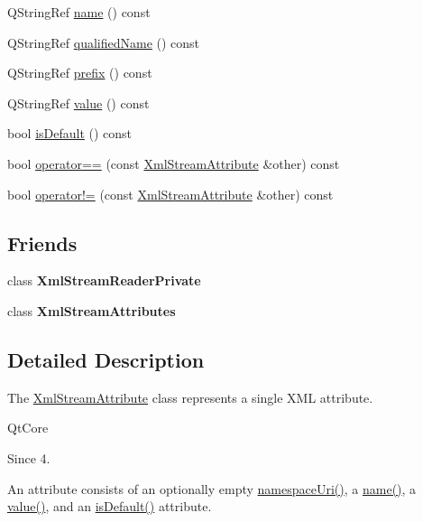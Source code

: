 \begin{DoxyCompactItemize}
Q\+String\+Ref \hyperlink{class_xml_stream_attribute_a2053ea2d13de7262dac760788ed8265f}{name} () const
\item 
Q\+String\+Ref \hyperlink{class_xml_stream_attribute_acc21c4ce8b0539d6c1131ab789171dd9}{qualified\+Name} () const
\item 
Q\+String\+Ref \hyperlink{class_xml_stream_attribute_a09aa6449118ecdcdbba90cc0b05f9e33}{prefix} () const
\item 
Q\+String\+Ref \hyperlink{class_xml_stream_attribute_a0cd7ec6aa7531c411ed20a354c2e7f24}{value} () const
\item 
bool \hyperlink{class_xml_stream_attribute_ab2798a63f4ca2dd71004602f94bddc53}{is\+Default} () const
\item 
bool \hyperlink{class_xml_stream_attribute_aeb585e0fb002453ec3a176accb119c6a}{operator==} (const \hyperlink{class_xml_stream_attribute}{Xml\+Stream\+Attribute} \&other) const
\item 
bool \hyperlink{class_xml_stream_attribute_a2a64fc419c69526cd7260cd49d7ad17f}{operator!=} (const \hyperlink{class_xml_stream_attribute}{Xml\+Stream\+Attribute} \&other) const
\end{DoxyCompactItemize}
\subsection*{Friends}
\begin{DoxyCompactItemize}
\item 
\mbox{\label{class_xml_stream_attribute_a07cbe8adea255c3bb802811c3872de83}} 
class {\bfseries Xml\+Stream\+Reader\+Private}
\item 
\mbox{\label{class_xml_stream_attribute_a7150ff3129fa35c4da7a86be5f547999}} 
class {\bfseries Xml\+Stream\+Attributes}
\end{DoxyCompactItemize}


\subsection{Detailed Description}
The \hyperlink{class_xml_stream_attribute}{Xml\+Stream\+Attribute} class represents a single X\+ML attribute. 

Qt\+Core \begin{DoxySince}{Since}
4. 
\end{DoxySince}
An attribute consists of an optionally empty \hyperlink{class_xml_stream_attribute_adf6da78e3783c50df9ce1d950e0b94c8}{namespace\+Uri()}, a \hyperlink{class_xml_stream_attribute_a2053ea2d13de7262dac760788ed8265f}{name()}, a \hyperlink{class_xml_stream_attribute_a0cd7ec6aa7531c411ed20a354c2e7f24}{value()}, and an \hyperlink{class_xml_stream_attribute_ab2798a63f4ca2dd71004602f94bddc53}{is\+Default()} attribute.

